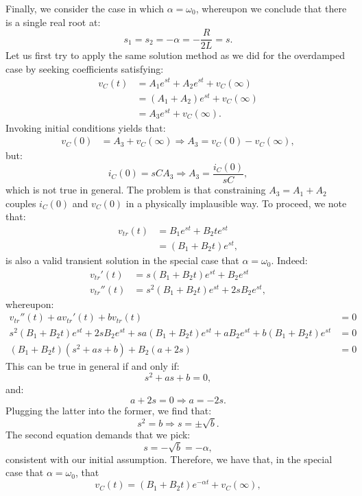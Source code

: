 \documentclass[twoside]{article}
\begin{document}
Finally, we consider the case in which $\alpha = \omega_{0}$, whereupon we conclude that there is a single real root at:
\[
    s_{1} = s_{2} = -\alpha = -\frac{R}{2L} = s.
\]
Let us first try to apply the same solution method as we did for the overdamped case by seeking coefficients satisfying:
\begin{align*}
    v_{C}(t) &= A_{1}e^{st} + A_{2}e^{st} + v_{C}(\infty)\\
             &= (A_{1} + A_{2})e^{st} + v_{C}(\infty) \\
             &= A_{3}e^{st} + v_{C}(\infty).
\end{align*}
Invoking initial conditions yields that:
\begin{align*}
    v_{C}(0) &= A_{3} + v_{C}(\infty) \Rightarrow A_{3} = v_{C}(0) - v_{C}(\infty),
\end{align*}
but:
\[
    i_{C}(0) = sCA_{3} \Rightarrow A_{3} = \frac{i_{C}(0)}{sC},
\]
which is not true in general. The problem is that constraining $A_{3} = A_{1} + A_{2}$ couples $i_{C}(0)$ and $v_{C}(0)$ in a physically implausible way. To proceed, we note that:
\begin{align*}
    v_{tr}(t) &= B_{1}e^{st} + B_{2}te^{st} \\
    &= (B_{1} + B_{2}t)e^{st},
\end{align*}
is also a valid transient solution in the special case that $\alpha = \omega_{0}$. Indeed:
\begin{align*}
    v_{tr}'(t) &= s(B_{1} + B_{2}t)e^{st} + B_{2}e^{st} \\
    v_{tr}''(t) &= s^{2}(B_{1} + B_{2}t)e^{st} + 2sB_{2}e^{st},
\end{align*}
whereupon:
\begin{align*}
    v_{tr}''(t) + av_{tr}'(t) + bv_{tr}(t) &=  0 \\
    s^{2}(B_{1} + B_{2}t)e^{st} + 2sB_{2}e^{st} + sa(B_{1} + B_{2}t)e^{st} + aB_{2}e^{st} + b(B_{1} + B_{2}t)e^{st} &= 0 \\
 (B_{1} + B_{2}t)(s^{2} + as + b) + B_{2}(a + 2s) &= 0
\end{align*}
This can be true in general if and only if:
\[
    s^{2} + as + b = 0,
\]
and:
\[
    a + 2s = 0 \Rightarrow a = -2s.
\]
Plugging the latter into the former, we find that:
\[
    s^{2} = b \Rightarrow s = \pm \sqrt{b}.
\]
The second equation demands that we pick:
\[
    s = -\sqrt{b} = -\alpha,
\]
consistent with our initial assumption. Therefore, we have that, in the special case that $\alpha = \omega_{0}$, that
\[
    v_{C}(t) = (B_{1} + B_{2}t)e^{-\alpha t} + v_{C}(\infty),
\]
\end{document}
